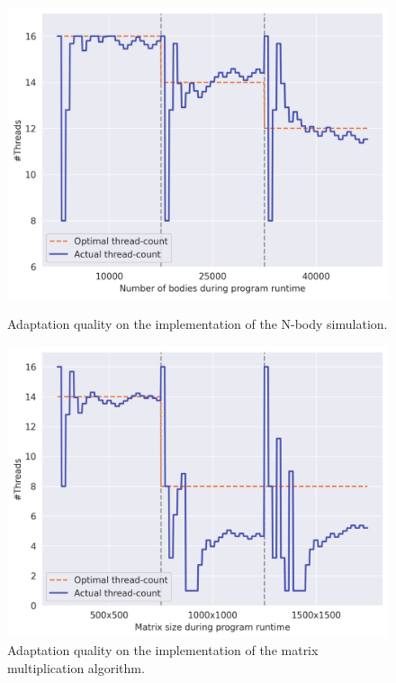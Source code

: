 \begin{figure}[t]
    \centering
    \begin{minipage}[c]{0.49\linewidth}
        \centering
        \captionsetup{width=0.9\linewidth}
        \includegraphics[width=\linewidth]{images/adapt_nbody.png}
        \caption{Adaptation quality on the \sac{} implementation of the N-body simulation.}
        \label{fig:adapt-nbody}
    \end{minipage}%
    \begin{minipage}[c]{0.49\linewidth}
        \centering
        \captionsetup{width=0.9\linewidth}
        \includegraphics[width=\linewidth]{images/adapt_matmul.png}
        \caption{Adaptation quality on the \sac{} implementation of the matrix multiplication algorithm.}
        \label{fig:adapt-matmul}
    \end{minipage}%
\end{figure}

